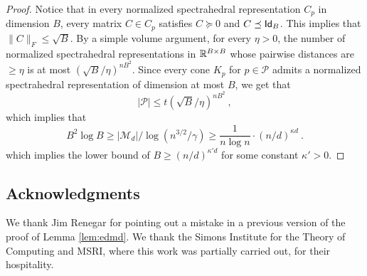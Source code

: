 \begin{proof}
Notice that in every normalized spectrahedral representation $C_p$ in dimension $B$, every matrix $C \in C_p$ satisfies $C \succeq 0$ and $C \preceq \mathsf{Id}_B$.  This implies that $\|C\|_{F} \leq \sqrt{B}$.  By a simple volume argument, for every $\eta > 0$, the number of normalized  spectrahedral representations in $\mathbb{R}^{B\times B} $ whose pairwise distances are $\geq \eta$ is at most $\left( \sqrt{B} /\eta \right)^{nB^2}$.  Since every cone $K_p$ for $p \in \mathcal{P}$ admits a normalized spectrahedral representation of dimension at most $B$, we get that
\[ |\mathcal{P}| \leq t \left(\sqrt{B} /\eta \right)^{nB^2} \ ,\]
which implies that
\[ B^2 \log B \geq  |\mathcal{M}_d |/\log(n^{3/2}/ \gamma) \geq \frac{1}{n \log n}  \cdot (n/ d)^{\kappa d}  \ . \]
which implies the lower bound of  $B \geq (n/d)^{\kappa' d}$ for some constant $\kappa' > 0$.
\end{proof}  

\subsection*{Acknowledgments} We thank Jim Renegar for pointing out a mistake in a previous version of the proof of Lemma \ref{lem:edmd}. We thank
the Simons Institute for the Theory of Computing and MSRI, where this work was partially carried out, for their hospitality.
